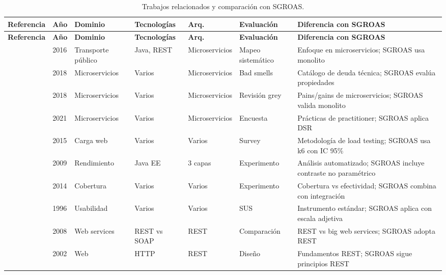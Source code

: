 \begin{longtable}{@{}p{2.2cm}p{1cm}p{1.8cm}p{1.8cm}p{1.5cm}p{1.5cm}p{2cm}@{}}
\caption{Trabajos relacionados y comparación con SGROAS.}
\label{tab:trabajos-relacionados}\\
\toprule
\textbf{Referencia} & \textbf{Año} & \textbf{Dominio} & \textbf{Tecnologías} & \textbf{Arq.} & \textbf{Evaluación} & \textbf{Diferencia con SGROAS} \\
\midrule
\endfirsthead
\toprule
\textbf{Referencia} & \textbf{Año} & \textbf{Dominio} & \textbf{Tecnologías} & \textbf{Arq.} & \textbf{Evaluación} & \textbf{Diferencia con SGROAS} \\
\midrule
\endhead
\cite{alshuqayran2016} & 2016 & Transporte público & Java, REST & Microservicios & Mapeo sistemático & Enfoque en microservicios; SGROAS usa monolito \\ \midrule
\cite{taibi2018} & 2018 & Microservicios & Varios & Microservicios & Bad smells & Catálogo de deuda técnica; SGROAS evalúa propiedades \\ \midrule
\cite{soldani2018} & 2018 & Microservicios & Varios & Microservicios & Revisión grey & Pains/gains de microservicios; SGROAS valida monolito \\ \midrule
\cite{waseem2021} & 2021 & Microservicios & Varios & Microservicios & Encuesta & Prácticas de practitioner; SGROAS aplica DSR \\ \midrule
\cite{jiang2015} & 2015 & Carga web & Varios & Varios & Survey & Metodología de load testing; SGROAS usa k6 con IC 95\% \\ \midrule
\cite{jiang2009} & 2009 & Rendimiento & Java EE & 3 capas & Experimento & Análisis automatizado; SGROAS incluye contraste no paramétrico \\ \midrule
\cite{inozemtseva2014} & 2014 & Cobertura & Varios & Varios & Experimento & Cobertura vs efectividad; SGROAS combina con integración \\ \midrule
\cite{brooke1996} & 1996 & Usabilidad & Varios & Varios & SUS & Instrumento estándar; SGROAS aplica con escala adjetiva \\ \midrule
\cite{pautasso2008} & 2008 & Web services & REST vs SOAP & REST & Comparación & REST vs big web services; SGROAS adopta REST \\ \midrule
\cite{fielding2002} & 2002 & Web & HTTP & REST & Diseño & Fundamentos REST; SGROAS sigue principios REST \\
\bottomrule
\end{longtable}

